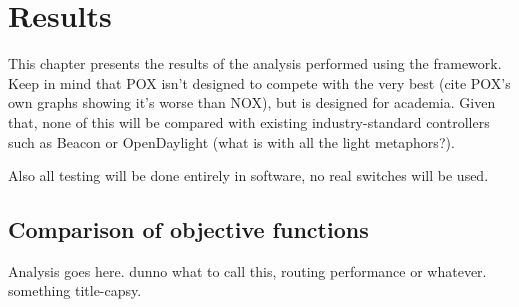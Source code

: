 \chapter{Results}

This chapter presents the results of the analysis performed using the framework. Keep in mind that POX isn't designed to compete with the very best (cite POX's own graphs showing it's worse than NOX), but is designed for academia. Given that, none of this will be compared with existing industry-standard controllers such as Beacon or OpenDaylight (what is with all the light metaphors?).

Also all testing will be done entirely in software, no real switches will be used.

\section{Comparison of objective functions}
Analysis goes here. dunno what to call this, routing performance or whatever. something title-capsy.


